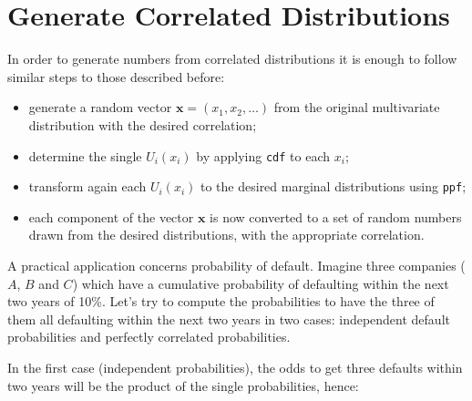 


\section{Generate Correlated Distributions}
\label{generate-correlated-distributions}

In order to generate numbers from correlated distributions it is enough to follow similar steps to those described before:

\begin{itemize}
\tightlist
\item
  generate a random vector \(\mathbf{x}=(x_1, x_2,\ldots)\) from the
  original multivariate distribution with the desired correlation;
\item
  determine the single \(U_i(x_i)\) by applying \texttt{cdf} to each
  \(x_i\);
\item
  transform again each \(U_i(x_i)\) to the desired marginal
  distributions using \texttt{ppf};
\item
  each component of the vector \(\mathbf{x}\) is now converted to a set
  of random numbers drawn from the desired distributions, with the
  appropriate correlation.
\end{itemize}

A practical application concerns probability of default. Imagine three companies ($A$, $B$ and $C$) which have a cumulative probability of defaulting within the next two years of 10\%.
Let's try to compute the probabilities to have the three of them all defaulting within the next two years in two cases: independent default probabilities and perfectly correlated probabilities.

In the first case (independent probabilities), the odds to get three defaults within two years will be the product of the single probabilities, hence:

